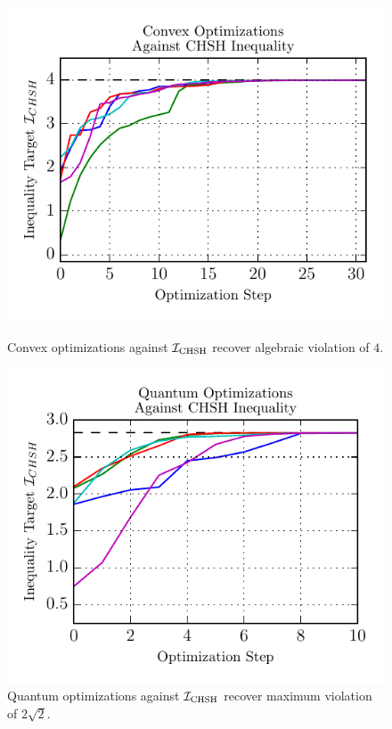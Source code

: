 \documentclass[aps, 10pt, english, twoside, pra, nofootinbib, longbibliography]{revtex4-1}
\theoremstyle{plain}
\theoremstyle{definition}
\theoremstyle{remark}
\begin{document}
    \begin{figure}
    \newlength\figureheight
    \newlength\figurewidth
    \setlength\figureheight{2.7in}
    \setlength{}
    \begin{center}
        \begin{minipage}[b]{.48\textwidth}
            \centering
            \includegraphics{../figures/CHSH_convex.pdf}
            \caption{Convex optimizations against $\mathcal{I}_\text{CHSH}$ recover algebraic violation of $4$.}
            \label{fig:CHSH_convex}
        \end{minipage}\hspace{0.04\textwidth}%
        \begin{minipage}[b]{.48\textwidth}
            \centering
            \includegraphics{../figures/CHSH_quantum.pdf}
            \caption{Quantum optimizations against $\mathcal{I}_\text{CHSH}$ recover maximum violation of $2\sqrt{2}$.}
            \label{fig:CHSH_quantum}
        \end{minipage}
    \end{center}
    \end{figure}
\end{document}
